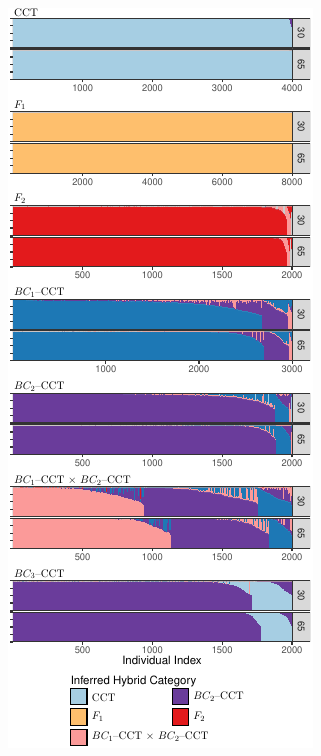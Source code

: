 {\begin{figure}
{\includegraphics[width=0.98\columnwidth]{figures/newhybs-texed-crop.pdf}
}
\end{figure}}
